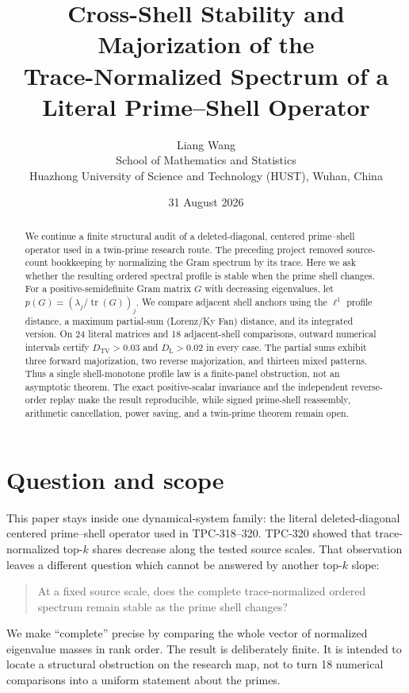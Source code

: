 \documentclass[10pt]{article}
\title{Cross-Shell Stability and Majorization of the\\
Trace-Normalized Spectrum of a Literal Prime--Shell Operator}
\author{Liang Wang\\
School of Mathematics and Statistics\\
Huazhong University of Science and Technology (HUST), Wuhan, China}
\date{31 August 2026}
\newcommand{\tr}{\operatorname{tr}}
\begin{document}
\maketitle

\begin{abstract}
We continue a finite structural audit of a deleted-diagonal, centered
prime--shell operator used in a twin-prime research route.  The preceding
project removed source-count bookkeeping by normalizing the Gram spectrum by
its trace.  Here we ask whether the resulting ordered spectral profile is
stable when the prime shell changes.  For a positive-semidefinite Gram matrix
$G$ with decreasing eigenvalues, let
$p(G)=(\lambda_j/\tr(G))_j$.  We compare adjacent shell anchors using the
\(\ell^1\) profile distance, a maximum partial-sum (Lorenz/Ky Fan) distance, and its
integrated version.  On 24 literal matrices and 18 adjacent-shell
comparisons, outward numerical intervals certify $D_{\mathrm{TV}}>0.03$ and
$D_{\mathrm{L}}>0.02$ in every case.  The partial sums exhibit three forward
majorization, two reverse majorization, and thirteen mixed patterns.  Thus a
single shell-monotone profile law is a finite-panel obstruction, not an
asymptotic theorem.  The exact positive-scalar invariance and the independent
reverse-order replay make the result reproducible, while signed prime-shell
reassembly, arithmetic cancellation, power saving, and a twin-prime theorem
remain open.
\end{abstract}

\section{Question and scope}

This paper stays inside one dynamical-system family: the literal
deleted-diagonal centered prime--shell operator used in TPC-318--320.  TPC-320
showed that trace-normalized top-$k$ shares decrease along the tested source
scales.  That observation leaves a different question which cannot be
answered by another top-$k$ slope:

\begin{quote}
At a fixed source scale, does the complete trace-normalized ordered spectrum
remain stable as the prime shell changes?
\end{quote}

We make ``complete'' precise by comparing the whole vector of normalized
eigenvalue masses in rank order.  The result is deliberately finite.  It is
intended to locate a structural obstruction on the research map, not to turn
18 numerical comparisons into a uniform statement about the primes.
\end{document}
